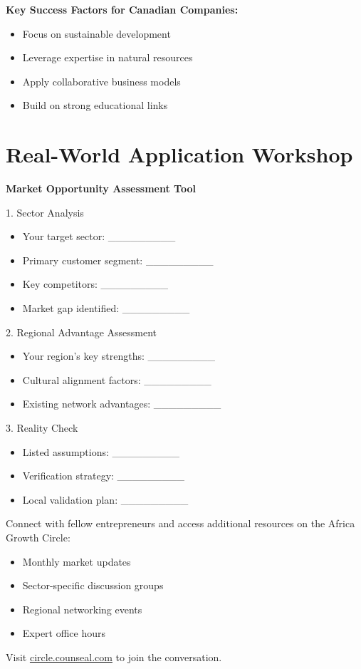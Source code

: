 \textbf{Key Success Factors for Canadian Companies:}
\begin{itemize}
    \item Focus on sustainable development
    \item Leverage expertise in natural resources
    \item Apply collaborative business models
    \item Build on strong educational links
\end{itemize}

\section{Real-World Application Workshop}

\begin{workshopbox}
\textbf{Market Opportunity Assessment Tool}

1. Sector Analysis
\begin{itemize}
    \item Your target sector: \_\_\_\_\_\_\_\_\_
    \item Primary customer segment: \_\_\_\_\_\_\_\_\_
    \item Key competitors: \_\_\_\_\_\_\_\_\_
    \item Market gap identified: \_\_\_\_\_\_\_\_\_
\end{itemize}

2. Regional Advantage Assessment
\begin{itemize}
    \item Your region's key strengths: \_\_\_\_\_\_\_\_\_
    \item Cultural alignment factors: \_\_\_\_\_\_\_\_\_
    \item Existing network advantages: \_\_\_\_\_\_\_\_\_
\end{itemize}

3. Reality Check
\begin{itemize}
    \item Listed assumptions: \_\_\_\_\_\_\_\_\_
    \item Verification strategy: \_\_\_\_\_\_\_\_\_
    \item Local validation plan: \_\_\_\_\_\_\_\_\_
\end{itemize}
\end{workshopbox}

\begin{communitybox}
Connect with fellow entrepreneurs and access additional resources on the Africa Growth Circle:
\begin{itemize}
    \item Monthly market updates
    \item Sector-specific discussion groups
    \item Regional networking events
    \item Expert office hours
\end{itemize}
Visit \href{https://viz.li/csl-book-agc}{circle.counseal.com} to join the conversation.
\end{communitybox}

